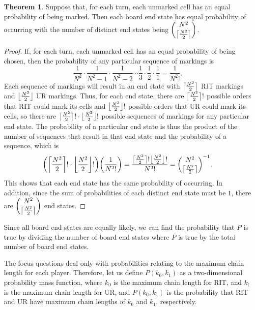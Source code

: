 \documentclass[12pt]{article}
\DeclarePairedDelimiter{\ceil}{\lceil}{\rceil}
\DeclarePairedDelimiter{\floor}{\lfloor}{\rfloor}
\theoremstyle{definition}
\theoremstyle{theorem}
\newtheorem{theorem}{Theorem}
\begin{document}
\begin{theorem}
  Suppose that, for each turn, each unmarked cell has an equal probability of being marked. Then each board end state has equal probability of occurring with the number of distinct end states being $\dbinom{N^2}{\ceil[\big]{\frac{N^2}{2}}}$.
\end{theorem}

\begin{proof}
  If, for each turn, each unmarked cell has an equal probability of being chosen, then the probability of any particular sequence of markings is
  $$\frac{1}{N^2} \cdot \frac{1}{N^2-1} \cdot \frac{1}{N^2-2} \cdots \frac{1}{3} \cdot \frac{1}{2} \cdot \frac{1}{1} = \frac{1}{N^2!} \text{.}$$
  Each sequence of markings will result in an end state with $\ceil[\big]{\frac{N^2}{2}}$ RIT markings and $\floor[\big]{\frac{N^2}{2}}$ UR markings. Thus, for each end state, there are $\ceil[\big]{\frac{N^2}{2}}!$ possible orders that RIT could mark its cells and $\floor[\big]{\frac{N^2}{2}}!$ possible orders that UR could mark its cells, so there are $\ceil[\big]{\frac{N^2}{2}}! \cdot \floor[\big]{\frac{N^2}{2}}!$ possible sequences of markings for any particular end state. The probability of a particular end state is thus the product of the number of sequences that result in that end state and the probability of a sequence, which is
  $$\bigg( \ceil[\bigg]{\frac{N^2}{2}}! \cdot \floor[\bigg]{\frac{N^2}{2}}! \bigg) \bigg( \frac{1}{N^2!} \bigg) = \frac{\ceil[\big]{\frac{N^2}{2}}! \floor[\big]{\frac{N^2}{2}}!}{N^2!} = \dbinom{N^2}{\ceil[\big]{\frac{N^2}{2}}} ^{-1} \text{.}$$
  This shows that each end state has the same probability of occurring. In addition, since the sum of probabilities of each distinct end state must be $1$, there are $\dbinom{N^2}{\ceil[\big]{\frac{N^2}{2}}}$ end states.
\end{proof}

Since all board end states are equally likely, we can find the probability that $P$ is true by dividing the number of board end states where $P$ is true by the total number of board end states.

The focus questions deal only with probabilities relating to the maximum chain length for each player. Therefore, let us define $P(k_0, k_1)$ as a two-dimensional probability mass function, where $k_0$ is the maximum chain length for RIT, and $k_1$ is the maximum chain length for UR, and $P(k_0, k_1)$ is the probability that RIT and UR have maximum chain lengths of $k_0$ and $k_1$, respectively.
\end{document}

